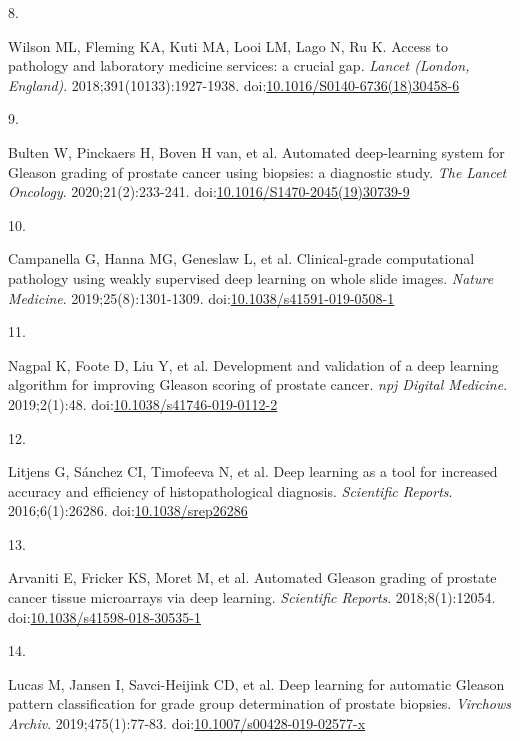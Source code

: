 \documentclass[
  12pt,
  a5,margin=2cmpaper,
]{article}
\newlength{\cslhangindent}
\newlength{\csllabelwidth}
\newlength{\cslentryspacingunit} %
\newenvironment{CSLReferences}[2] %
 {%
  \setlength{\parindent}{0pt}
  \ifodd #1
  \let\oldpar\par
  \def\par{\hangindent=\cslhangindent\oldpar}
  \fi
  \setlength{\parskip}{#2\cslentryspacingunit}
 }%
 {}
\newcommand{\CSLLeftMargin}[1]{\parbox[t]{\csllabelwidth}{#1}}
\newcommand{\CSLRightInline}[1]{\parbox[t]{\linewidth - \csllabelwidth}{#1}\break}
\begin{document}
\begin{CSLReferences}{0}{0}
\leavevmode{}%
\CSLLeftMargin{8. }%
\CSLRightInline{Wilson ML, Fleming KA, Kuti MA, Looi LM, Lago N, Ru K.
{Access to pathology and laboratory medicine services: a crucial gap.}
\emph{Lancet (London, England)}. 2018;391(10133):1927-1938.
doi:\href{https://doi.org/10.1016/S0140-6736(18)30458-6}{10.1016/S0140-6736(18)30458-6}}

\leavevmode{}%
\CSLLeftMargin{9. }%
\CSLRightInline{Bulten W, Pinckaers H, Boven H van, et al. {Automated
deep-learning system for Gleason grading of prostate cancer using
biopsies: a diagnostic study}. \emph{The Lancet Oncology}.
2020;21(2):233-241.
doi:\href{https://doi.org/10.1016/S1470-2045(19)30739-9}{10.1016/S1470-2045(19)30739-9}}

\leavevmode{}%
\CSLLeftMargin{10. }%
\CSLRightInline{Campanella G, Hanna MG, Geneslaw L, et al.
{Clinical-grade computational pathology using weakly supervised deep
learning on whole slide images}. \emph{Nature Medicine}.
2019;25(8):1301-1309.
doi:\href{https://doi.org/10.1038/s41591-019-0508-1}{10.1038/s41591-019-0508-1}}

\leavevmode{}%
\CSLLeftMargin{11. }%
\CSLRightInline{Nagpal K, Foote D, Liu Y, et al. {Development and
validation of a deep learning algorithm for improving Gleason scoring of
prostate cancer}. \emph{npj Digital Medicine}. 2019;2(1):48.
doi:\href{https://doi.org/10.1038/s41746-019-0112-2}{10.1038/s41746-019-0112-2}}

\leavevmode{}%
\CSLLeftMargin{12. }%
\CSLRightInline{Litjens G, Sánchez CI, Timofeeva N, et al. {Deep
learning as a tool for increased accuracy and efficiency of
histopathological diagnosis}. \emph{Scientific Reports}.
2016;6(1):26286.
doi:\href{https://doi.org/10.1038/srep26286}{10.1038/srep26286}}

\leavevmode{}%
\CSLLeftMargin{13. }%
\CSLRightInline{Arvaniti E, Fricker KS, Moret M, et al. {Automated
Gleason grading of prostate cancer tissue microarrays via deep
learning}. \emph{Scientific Reports}. 2018;8(1):12054.
doi:\href{https://doi.org/10.1038/s41598-018-30535-1}{10.1038/s41598-018-30535-1}}

\leavevmode{}%
\CSLLeftMargin{14. }%
\CSLRightInline{Lucas M, Jansen I, Savci-Heijink CD, et al. {Deep
learning for automatic Gleason pattern classification for grade group
determination of prostate biopsies}. \emph{Virchows Archiv}.
2019;475(1):77-83.
doi:\href{https://doi.org/10.1007/s00428-019-02577-x}{10.1007/s00428-019-02577-x}}


\end{CSLReferences}
\end{document}
